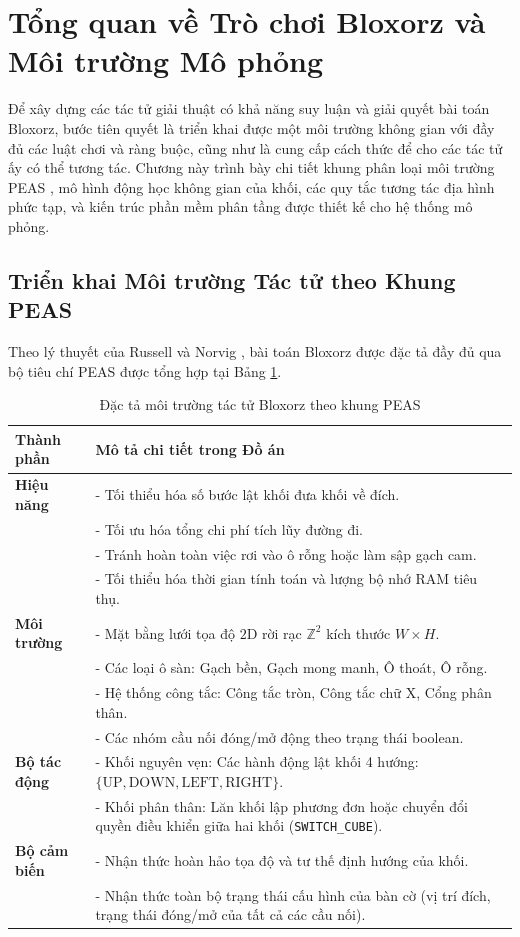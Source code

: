 \section{Tổng quan về Trò chơi Bloxorz và Môi trường Mô phỏng}
\label{sec:game_overview}

Để xây dựng các tác tử giải thuật có khả năng suy luận và giải quyết
bài toán Bloxorz, bước tiên quyết là triển khai được một môi trường không gian
với đầy đủ các luật chơi và ràng buộc, cũng như là cung cấp cách thức để cho 
các tác tử ấy có thể tương tác. Chương này trình bày chi tiết
khung phân loại môi trường PEAS \cite{russell2020aima}, mô hình động học không gian của khối,
các quy tắc tương tác địa hình phức tạp, và kiến trúc phần mềm phân tầng
được thiết kế cho hệ thống mô phỏng.

\subsection{Triển khai Môi trường Tác tử theo Khung PEAS}
\label{subsec:peas_framework}
Theo lý thuyết của Russell và Norvig \cite{russell2020aima}, bài toán
Bloxorz được đặc tả đầy đủ qua bộ tiêu chí PEAS được tổng hợp tại
Bảng \ref{tab:peas_spec}.

\begin{table}[H]
\centering
\caption{Đặc tả môi trường tác tử Bloxorz theo khung PEAS}
\label{tab:peas_spec}
\small
\begin{tabularx}{\textwidth}{l X}
\toprule
\textbf{Thành phần} & \textbf{Mô tả chi tiết trong Đồ án} \\
\midrule
\textbf{Hiệu năng} &
- Tối thiểu hóa số bước lật khối đưa khối về đích.\\
& - Tối ưu hóa tổng chi phí tích lũy đường đi.\\
& - Tránh hoàn toàn việc rơi vào ô rỗng hoặc làm sập gạch cam.\\
& - Tối thiểu hóa thời gian tính toán và lượng bộ nhớ RAM tiêu thụ.\\
\midrule
\textbf{Môi trường} &
- Mặt bằng lưới tọa độ $2\text{D}$ rời rạc $\mathbb{Z}^2$
kích thước $W \times H$.\\
& - Các loại ô sàn: Gạch bền, Gạch mong manh, Ô thoát, Ô rỗng.\\
& - Hệ thống công tắc: Công tắc tròn, Công tắc chữ X, Cổng phân thân.\\
& - Các nhóm cầu nối đóng/mở động theo trạng thái boolean.\\
\midrule
\textbf{Bộ tác động} &
- Khối nguyên vẹn: Các hành động lật khối 4 hướng:
$\{\text{UP}, \text{DOWN}, \text{LEFT}, \text{RIGHT}\}$.\\
& - Khối phân thân: Lăn khối lập phương đơn hoặc chuyển đổi
quyền điều khiển giữa hai khối (\texttt{SWITCH\_CUBE}).\\
\midrule
\textbf{Bộ cảm biến} &
- Nhận thức hoàn hảo tọa độ và tư thế định hướng của khối.\\
& - Nhận thức toàn bộ trạng thái cấu hình của bàn cờ (vị trí đích,
trạng thái đóng/mở của tất cả các cầu nối).\\
\bottomrule
\end{tabularx}
\end{table}

